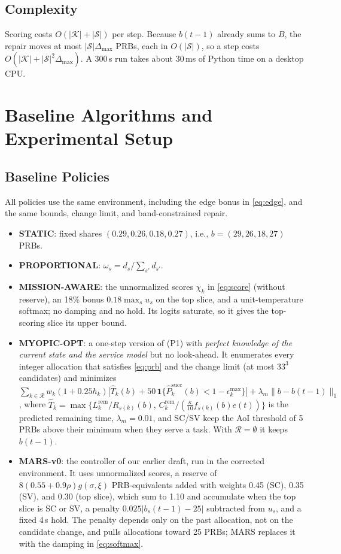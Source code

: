 \documentclass[conference]{IEEEtran}
\newcommand{\ind}[1]{\mathbf{1}\{#1\}}
\begin{document}
\subsection{Complexity}
Scoring costs $O(|\mathcal{K}|+|\mathcal{S}|)$ per step. Because $b(t-1)$ already sums to $B$, the repair moves at most $|\mathcal{S}|\Delta_{\max}$ PRBs, each in $O(|\mathcal{S}|)$, so a step costs $O(|\mathcal{K}|+|\mathcal{S}|^2\Delta_{\max})$. A 300\,s run takes about 30\,ms of Python time on a desktop CPU.

\section{Baseline Algorithms and Experimental Setup}\label{sec:setup}
\subsection{Baseline Policies}
All policies use the same environment, including the edge bonus in \eqref{eq:edge}, and the same bounds, change limit, and band-constrained repair.
\begin{itemize}
\item \textbf{STATIC}: fixed shares $(0.29,0.26,0.18,0.27)$, i.e., $b=(29,26,18,27)$ PRBs.
\item \textbf{PROPORTIONAL}: $\omega_s=d_s/\sum_{s'}d_{s'}$.
\item \textbf{MISSION-AWARE}: the unnormalized scores $\chi_k$ in \eqref{eq:score} (without reserve), an 18\% bonus $0.18\max_s u_s$ on the top slice, and a unit-temperature softmax; no damping and no hold. Its logits saturate, so it gives the top-scoring slice its upper bound.
\item \textbf{MYOPIC-OPT}: a one-step version of (P1) with \emph{perfect knowledge of the current state and the service model} but no look-ahead. It enumerates every integer allocation that satisfies \eqref{eq:prb} and the change limit (at most $33^3$ candidates) and minimizes $\sum_{k\in\mathcal{R}}w_k(1+0.25h_k)\big[\hat T_k(b)+50\,\ind{\hat P_k^{\mathrm{succ}}(b)<1-\epsilon_k^{\max}}\big]+\lambda_m\|b-b(t-1)\|_1$, where $\hat T_k=\max\{L_k^{\mathrm{rem}}/R_{s(k)}(b),\,C_k^{\mathrm{rem}}/(\tfrac{\kappa}{10}f_{s(k)}(b)e(t))\}$ is the predicted remaining time, $\lambda_m=0.01$, and SC/SV keep the AoI threshold of 5 PRBs above their minimum when they serve a task. With $\mathcal{R}=\emptyset$ it keeps $b(t-1)$.
\item \textbf{MARS-v0}: the controller of our earlier draft, run in the corrected environment. It uses unnormalized scores, a reserve of $8(0.55+0.9\rho)g(\sigma,\xi)$ PRB-equivalents added with weights 0.45 (SC), 0.35 (SV), and 0.30 (top slice), which sum to 1.10 and accumulate when the top slice is SC or SV, a penalty $0.025|b_s(t-1)-25|$ subtracted from $u_s$, and a fixed 4\,s hold. The penalty depends only on the past allocation, not on the candidate change, and pulls allocations toward 25 PRBs; MARS replaces it with the damping in \eqref{eq:softmax}.
\end{itemize}
\end{document}

